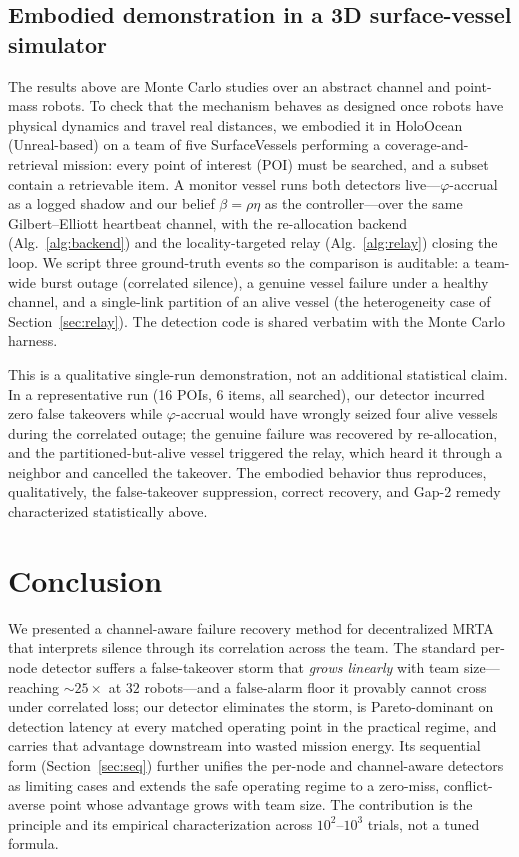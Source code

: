 \documentclass[conference]{IEEEtran}
\begin{document}
\subsection{Embodied demonstration in a 3D surface-vessel simulator}
\label{sec:holoocean}
The results above are Monte Carlo studies over an abstract channel and point-mass
robots. To check that the mechanism behaves as designed once robots have physical
dynamics and travel real distances, we embodied it in HoloOcean (Unreal-based) on
a team of five SurfaceVessels performing a coverage-and-retrieval mission: every
point of interest (POI) must be searched, and a subset contain a retrievable item.
A monitor vessel runs both detectors live---$\varphi$-accrual as a logged shadow
and our belief $\beta=\rho\eta$ as the controller---over the same Gilbert--Elliott
heartbeat channel, with the re-allocation backend (Alg.~\ref{alg:backend}) and the
locality-targeted relay (Alg.~\ref{alg:relay}) closing the loop. We script three
ground-truth events so the comparison is auditable: a team-wide burst outage
(correlated silence), a genuine vessel failure under a healthy channel, and a
single-link partition of an alive vessel (the heterogeneity case of
Section~\ref{sec:relay}). The detection code is shared verbatim with the
Monte Carlo harness.

This is a qualitative single-run demonstration, not an additional statistical
claim. In a representative run (16 POIs, 6 items, all searched), our detector
incurred zero false takeovers while $\varphi$-accrual would have wrongly seized
four alive vessels during the correlated outage; the genuine failure was recovered
by re-allocation, and the partitioned-but-alive vessel triggered the relay, which
heard it through a neighbor and cancelled the takeover. The embodied behavior thus
reproduces, qualitatively, the false-takeover suppression, correct recovery, and
Gap-2 remedy characterized statistically above.

\section{Conclusion}
We presented a channel-aware failure recovery method for decentralized MRTA that
interprets silence through its correlation across the team. The standard per-node
detector suffers a false-takeover storm that \emph{grows linearly} with team
size---reaching $\sim$$25\times$ at $32$ robots---and a false-alarm floor it
provably cannot cross under correlated loss; our detector eliminates the storm,
is Pareto-dominant on detection latency at every matched operating point in the
practical regime, and carries that advantage downstream into wasted mission
energy. Its sequential form (Section~\ref{sec:seq}) further unifies the
per-node and channel-aware detectors as limiting cases and extends the safe
operating regime to a zero-miss, conflict-averse point whose advantage grows with
team size. The contribution is the principle and its empirical characterization
across $10^{2}$--$10^{3}$ trials, not a tuned formula.
\end{document}
